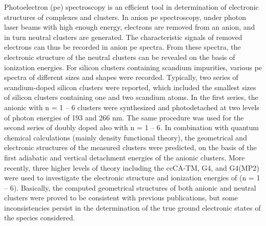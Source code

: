 \begin{refsection}
Photoelectron (\acrshort{pe}) spectroscopy is an efficient tool in determination of electronic structures of complexes and clusters. \cite{c3:11} In anion \acrshort{pe} spectroscopy, under photon laser beams with high enough energy, electrons are removed from an anion, and in turn neutral clusters are generated. The characteristic signals of removed electrons can thus be recorded in anion \acrshort{pe} spectra. From these spectra, the electronic structure of the neutral clusters can be revealed on the basis of ionization energies. For silicon clusters containing scandium impurities, various \acrshort{pe} spectra of different sizes and shapes were recorded. \cite{c3:12, c3:13, c3:14, c3:15} Typically, two series of scandium-doped silicon clusters were reported, \cite{c3:14, c3:15} which included the smallest sizes of silicon clusters containing one and two scandium atoms. In the first series,\cite{c3:14} the anionic  with n = 1 -- 6 clusters were synthesized and photodetached at two levels of photon energies of 193 and 266 nm. The same procedure was used for the second series of doubly doped  also with n = 1 -- 6.\cite{c3:15} In combination with quantum chemical calculations (mainly density functional theory), the geometrical and electronic structures of the measured clusters were predicted, on the basis of the first adiabatic and vertical detachment energies of the anionic clusters. More recently, three higher levels of theory including the ccCA-TM, G4, and G4(MP2) were used to investigate the electronic structure and ionization energies of  (n = 1 -- 6).\cite{c3:16} Basically, the computed geometrical structures of both anionic and neutral clusters were proved to be consistent with previous publications,\cite{c3:9, c3:14} but some inconsistencies persist in the determination of the true ground electronic states of the species considered. 





\end{refsection}
